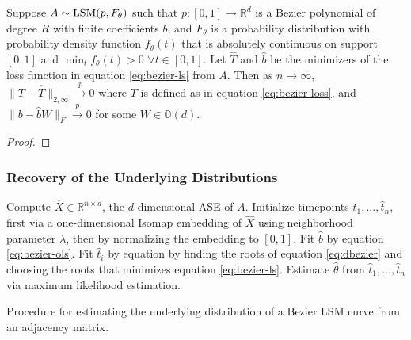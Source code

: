 \documentclass[12pt]{article}
\begin{document}
\begin{theorem}
\label{thm:bezier-consistency}
Suppose $A \sim \mathrm{LSM}(p, F_\theta)$ such that $p : [0, 1] \to \mathbb{R}^d$ is a Bezier polynomial of degree $R$ with finite coefficients $b$, and $F_\theta$ is a probability distribution with probability density function $f_\theta(t)$ that is absolutely continuous on support $[0, 1]$ and $\min_t f_\theta(t) > 0$ $\forall t \in [0, 1]$. 
Let $\hat{T}$ and $\hat{b}$ be the minimizers of the loss function in equation \ref{eq:bezier-ls} from $A$. 
Then as $n \to \infty$, $\|T - \hat{T}\|_{2, \infty} \stackrel{p}{\to} 0$ where $T$ is defined as in equation \ref{eq:bezier-loss}, and $\|b - \hat{b} W \|_F \stackrel{p}{\to} 0$ for some $W \in \mathbb{O}(d)$.
\end{theorem}

\begin{proof}

\end{proof}

\subsubsection{Recovery of the Underlying
Distributions}\label{recovery-of-the-underlying-distributions}

\begin{algorithm}[H]
\label{alg:bezier-param-fit}
\DontPrintSemicolon
\SetAlgoLined
{}
Compute $\hat{X} \in \mathbb{R}^{n \times d}$, the $d$-dimensional ASE of $A$.\;
Initialize timepoints $\hat{t}_1, ..., \hat{t}_n$, first via a one-dimensional Isomap embedding of $\hat{X}$ using neighborhood parameter $\lambda$, then by normalizing the embedding to $[0, 1]$.\;
 {
  Fit $\hat{b}$ by equation \ref{eq:bezier-ols}.\;
   {
    Fit $\hat{t}_i$ by equation by finding the roots of equation \ref{eq:dbezier} and choosing the roots that minimizes equation \ref{eq:bezier-ls}.\;
  }
}
Estimate $\hat{\theta}$ from $\hat{t}_1, ..., \hat{t}_n$ via maximum likelihood estimation.\; 
\caption{Procedure for estimating the underlying distribution of a Bezier LSM curve from an adjacency matrix.}
\end{algorithm}
\end{document}
